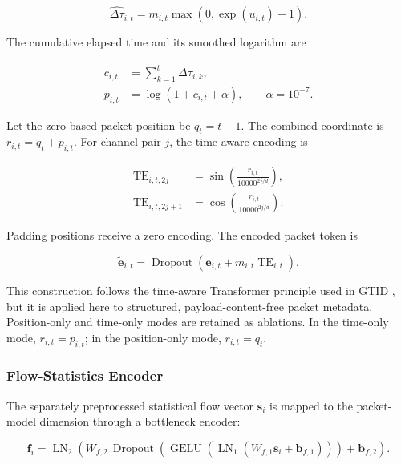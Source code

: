 \begin{equation}
    \widehat{\Delta\tau}_{i,t}
    =m_{i,t}\max\left(0,\exp(u_{i,t})-1\right).
    \label{eq:reconstructed_iat}
\end{equation}

The cumulative elapsed time and its smoothed logarithm are

\begin{align}
    c_{i,t} &= \sum_{k=1}^{t}\widehat{\Delta\tau}_{i,k},\\
    p_{i,t} &= \log\left(1+c_{i,t}+\alpha\right),
    \qquad \alpha=10^{-7}.
    \label{eq:cumulative_time_feature}
\end{align}

Let the zero-based packet position be $q_t=t-1$. The combined coordinate is
$r_{i,t}=q_t+p_{i,t}$. For channel pair $j$, the time-aware encoding is

\begin{align}
    \operatorname{TE}_{i,t,2j}
    &=\sin\left(
        \frac{r_{i,t}}{10000^{2j/d}}
      \right),\\
    \operatorname{TE}_{i,t,2j+1}
    &=\cos\left(
        \frac{r_{i,t}}{10000^{2j/d}}
      \right).
    \label{eq:time_aware_sinusoid}
\end{align}

Padding positions receive a zero encoding. The encoded packet token is

\begin{equation}
    \widetilde{\mathbf{e}}_{i,t}
    =\operatorname{Dropout}
    \left(
        \mathbf{e}_{i,t}+m_{i,t}\operatorname{TE}_{i,t}
    \right).
    \label{eq:time_encoded_packet}
\end{equation}

This construction follows the time-aware Transformer principle used in GTID
\cite{Han2023GTID}, but it is applied here to structured, payload-content-free
packet metadata. Position-only and time-only modes are retained as ablations.
In the time-only mode, $r_{i,t}=p_{i,t}$; in the position-only mode,
$r_{i,t}=q_t$.

\subsubsection{Flow-Statistics Encoder}
\label{subsubsec:flow_encoder}

The separately preprocessed statistical flow vector $\mathbf{s}_i$ is mapped
to the packet-model dimension through a bottleneck encoder:

\begin{equation}
    \mathbf{f}_i
    =\operatorname{LN}_2
    \left(
        W_{f,2}\,
        \operatorname{Dropout}
        \left(
            \operatorname{GELU}
            \left(
                \operatorname{LN}_1(W_{f,1}\mathbf{s}_i+\mathbf{b}_{f,1})
            \right)
        \right)
        +\mathbf{b}_{f,2}
    \right).
    \label{eq:flow_feature_encoder}
\end{equation}

